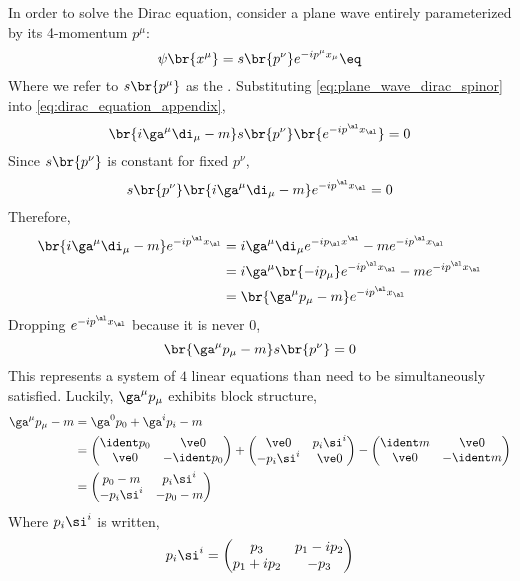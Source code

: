 \documentclass{article}
\begin{document}
In order to solve the Dirac equation, consider a plane wave entirely parameterized by its 4-momentum $p^{\mu}$:
\[ \psi\br{x^{\mu}} = s\br{p^{\nu}} e^{ - i p^{\mu} x_{\mu}} \eq \label{eq:plane_wave_dirac_spinor}\]
Where we refer to $s\br{p^{\mu}}$ as the . Substituting \cref{eq:plane_wave_dirac_spinor} into \cref{eq:dirac_equation_appendix},
\[ \br{i \ga^{\mu} \di_{\mu} - m}s\br{p^{\nu}} \br{e^{ - i p^{\al} x_{\al}}} = 0 \]
Since $s\br{p^{\nu}}$ is constant for fixed $p^{\nu}$,
\[ s\br{p^{\nu}}\br{i \ga^{\mu} \di_{\mu} - m} e^{ - i p^{\al} x_{\al}} = 0 \]
Therefore,
\begin{align*}
\br{i \ga^{\mu} \di_{\mu} - m} e^{ - i p^{\al} x_{\al}}
&= i \ga^{\mu} \di_{\mu}e^{ - i p_{\al} x^{\al}} - me^{ - i p^{\al} x_{\al}} \\
&= i \ga^{\mu} \br{-i p_{\mu}} e^{-i p^{\al} x_{\al}} - me^{ - i p^{\al} x_{\al}} \\
&= \br{\ga^{\mu} p_{\mu} - m} e^{-i p^{\al} x_{\al}}
\end{align*}
Dropping $e^{-i p^{\al} x_{\al}}$ because it is never $0$,
\[ \br{\ga^{\mu} p_{\mu} - m}s\br{p^{\nu}} = 0 \]
This represents a system of $4$ linear equations than need to be simultaneously satisfied. Luckily, $\ga^{\mu} p_{\mu}$ exhibits block structure,
\begin{align*}
\ga^{\mu} p_{\mu} - m
&= \ga^{0} p_0 + \ga^{i} p_i - m \\
&= \begin{pmatrix}
    \ident p_0 & \ve 0 \\
    \ve 0 & - \ident p_0 \\
\end{pmatrix} + \begin{pmatrix}
    \ve 0 & p_i\si^{i} \\
    -p_i\si^{i} & \ve 0 \\
\end{pmatrix} - \begin{pmatrix}
    \ident m & \ve 0 \\
    \ve 0 & - \ident m \\
\end{pmatrix} \\
&= \begin{pmatrix}
    p_0 - m & p_i\si^{i} \\
    -p_i\si^{i} & - p_0 - m \\
\end{pmatrix}
\end{align*}
Where $p_i\si^{i}$ is written,
\[ p_i\si^{i} = \begin{pmatrix}
    p_3 & p_1 - i p_2 \\
    p_1 + i p_2 & -p_3 \\
\end{pmatrix} \]
\end{document}
